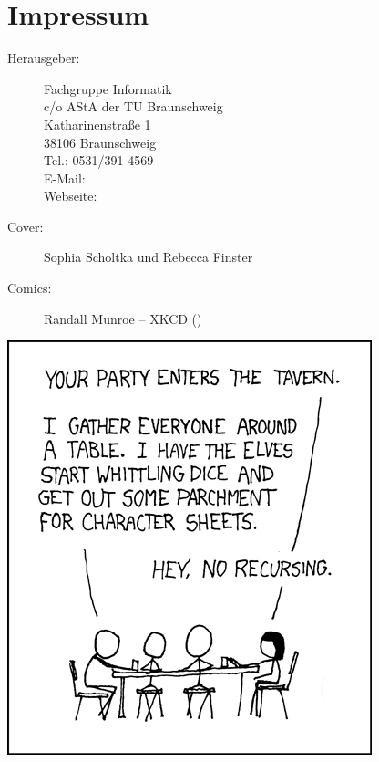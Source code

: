 
\section{Impressum}
\label{impressum}
\begin{description}
\item[Herausgeber:]
	Fachgruppe Informatik\\
	c/o AStA der TU Braunschweig\\
	Katharinenstraße 1\\
	38106 Braunschweig\\
	Tel.: 0531/391-4569\\
	E-Mail: \\
	Webseite: \fginfoUrl
\item[Cover:] Sophia Scholtka und Rebecca Finster
\item[Comics:] Randall Munroe -- XKCD ()
\end{description}
\begin{center}
		\includegraphics[totalheight=10cm]{bilder/XKCD/tabletop_roleplaying}
\end{center}